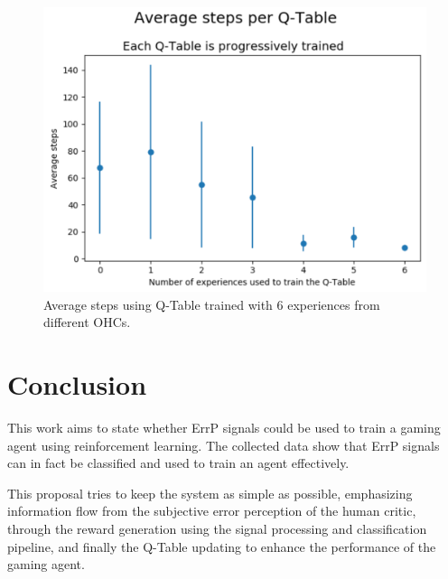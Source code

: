 \documentclass[journal]{IEEEtran}
\begin{document}
{{\begin{figure}[h!]
\centering
\includegraphics[scale=0.4]{Images/Average_steps/all.png}
\caption{Average steps using Q-Table trained with 6 experiences from different OHCs.}
\label{fig:avg_steps_all}
\end{figure}

\section{Conclusion}
\label{conclusions}


This work aims to state whether ErrP signals could be used to train a gaming agent using reinforcement learning. The collected data show that ErrP signals can in fact be classified and used to train an agent effectively. 

This proposal tries to keep the system as simple as possible, emphasizing information flow from the subjective error perception of the human critic, through the reward generation using the signal processing and classification pipeline, and finally the Q-Table updating  to enhance the performance of the gaming agent.


}}
\end{document}
